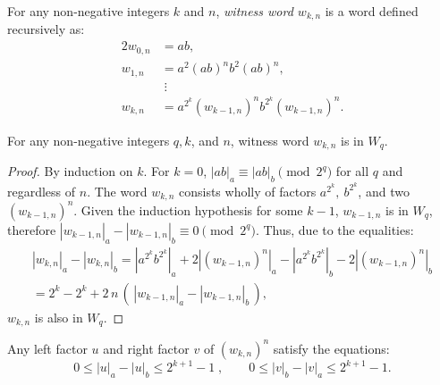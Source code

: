 \begin{defn}
    For any non-negative integers $k$ and $n$, \emph{witness word $w_{k,n}$} is a word defined recursively as:
    \begin{alignat*}{2}
        w_{0,n} &= ab,\\
        w_{1,n} &= a^2 {(ab)}^n b^2 {(ab)}^n,\\
                &\; \vdots \\
        w_{k,n} &= a^{2^k} {(w_{k-1,n})}^n b^{2^k} {(w_{k-1,n})}^n.
    \end{alignat*}
\end{defn}

\begin{lemma}\label{lm:witness_words_in_W_q}
    For any non-negative integers $q, k$, and $n$, witness word $w_{k,n}$ is in $W_q$.
\end{lemma}

\begin{proof}
    By induction on $k$. For $k = 0$, $|ab|_a \equiv |ab|_b \pmod{2^q}$ for all $q$ and regardless of $n$. The word $w_{k,n}$ consists wholly of factors $a^{2^k}, \: b^{2^k}$, and two ${(w_{k-1,n})}^n$. Given the induction hypothesis for some $k - 1$, $w_{k-1,n}$ is in $W_q$, therefore $|w_{k-1,n}|_a - |w_{k-1,n}|_b \equiv 0 \pmod{2^q}$. Thus, due to the equalities:
    \begin{multline*}
        |w_{k,n}|_a - |w_{k,n}|_b = |a^{2^k} b^{2^k}|_a + 2|{(w_{k-1,n})}^n|_a - |a^{2^k} b^{2^k}|_b - 2|{(w_{k-1,n})}^n|_b \\
        = 2^k - 2^k + 2 \, n \, ( \, |w_{k-1,n}|_a - |w_{k-1,n}|_b \, ),
    \end{multline*}
    $w_{k,n}$ is also in $W_q$.
\end{proof}

\begin{lemma}\label{lm:witness_words_inequalities}
    Any left factor $u$ and right factor $v$ of ${(w_{k,n})}^n$ satisfy the equations:
    \[
        0 \leq |u|_a - |u|_b \leq 2^{k+1}-1 \; , \qquad 0 \leq |v|_b - |v|_a \leq 2^{k+1}-1.
    \]
\end{lemma}

